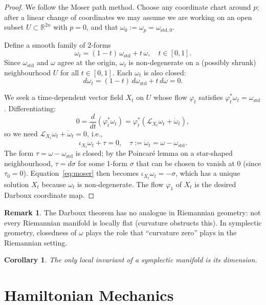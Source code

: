 \documentclass[12pt,a4paper]{amsart}
\newtheorem{corollary}[theorem]{Corollary}
\theoremstyle{definition}
\newtheorem{remark}[theorem]{Remark}
\begin{document}
\begin{proof}
We follow the Moser path method.  Choose any coordinate chart around $p$;
after a linear change of coordinates we may assume we are working on an open
subset $U \subset \mathbb{R}^{2n}$ with $p = 0$, and that
$\omega_0 := \omega_p = \omega_{\mathrm{std},0}$.

Define a smooth family of 2-forms
\[
  \omega_t = (1-t)\,\omega_{\mathrm{std}} + t\,\omega, \quad t \in [0,1].
\]
Since $\omega_{\mathrm{std}}$ and $\omega$ agree at the origin, $\omega_t$ is
non-degenerate on a (possibly shrunk) neighbourhood $U$ for all $t \in [0,1]$.
Each $\omega_t$ is also closed:
\[
  d\omega_t = (1-t)\,d\omega_{\mathrm{std}} + t\,d\omega = 0.
\]

We seek a time-dependent vector field $X_t$ on $U$ whose flow $\varphi_t$
satisfies $\varphi_t^* \omega_t = \omega_{\mathrm{std}}$.  Differentiating:
\[
  0 = \frac{d}{dt}(\varphi_t^* \omega_t) = \varphi_t^*\!\left(
    \mathcal{L}_{X_t}\omega_t + \dot{\omega}_t \right),
\]
so we need $\mathcal{L}_{X_t}\omega_t + \dot{\omega}_t = 0$, i.e.,
\begin{equation}\label{eq:moser}
  \iota_{X_t} \omega_t + \tau = 0, \quad \tau := \dot{\omega}_t = \omega - \omega_{\mathrm{std}}.
\end{equation}
The form $\tau = \omega - \omega_{\mathrm{std}}$ is closed; by the Poincar\'{e}
lemma on a star-shaped neighbourhood, $\tau = d\sigma$ for some 1-form
$\sigma$ that can be chosen to vanish at $0$ (since $\tau_0 = 0$).
Equation~\eqref{eq:moser} then becomes $\iota_{X_t}\omega_t = -\sigma$,
which has a unique solution $X_t$ because $\omega_t$ is non-degenerate.
The flow $\varphi_1$ of $X_t$ is the desired Darboux coordinate map.
\end{proof}

\begin{remark}
The Darboux theorem has no analogue in Riemannian geometry: not every
Riemannian manifold is locally flat (curvature obstructs this).  In
symplectic geometry, closedness of $\omega$ plays the role that ``curvature
zero'' plays in the Riemannian setting.
\end{remark}

\begin{corollary}
The only local invariant of a symplectic manifold is its dimension.
\end{corollary}

\section{Hamiltonian Mechanics}
\label{sec:hamilton}
\end{document}
